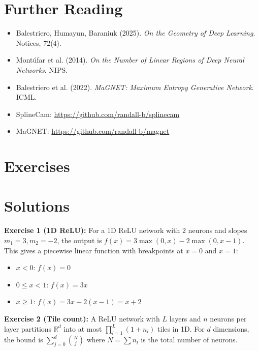 \section{Further Reading}
\label{sec:dl:refs}

\begin{itemize}
    \item Balestriero, Humayun, Baraniuk (2025). \textit{On the Geometry of Deep Learning}. Notices, 72(4).
    \item Montúfar et al. (2014). \textit{On the Number of Linear Regions of Deep Neural Networks}. NIPS.
    \item Balestriero et al. (2022). \textit{MaGNET: Maximum Entropy Generative Network}. ICML.
    \item SplineCam: \url{https://github.com/randall-b/splinecam}
    \item MaGNET: \url{https://github.com/randall-b/magnet}
\end{itemize}

\section{Exercises}
\section{Solutions}
\label{sec:dl:solutions}

\begin{solution}
\textbf{Exercise 1 (1D ReLU):} For a 1D ReLU network with 2 neurons and slopes $m_1 = 3, m_2 = -2$, the output is $f(x) = 3\max(0,x) - 2\max(0,x-1)$. This gives a piecewise linear function with breakpoints at $x = 0$ and $x = 1$:
\begin{itemize}
    \item $x < 0$: $f(x) = 0$
    \item $0 \leq x < 1$: $f(x) = 3x$
    \item $x \geq 1$: $f(x) = 3x - 2(x-1) = x + 2$
\end{itemize}
\end{solution}

\begin{solution}
\textbf{Exercise 2 (Tile count):} A ReLU network with $L$ layers and $n$ neurons per layer partitions $\mathbb{R}^d$ into at most $\prod_{l=1}^L (1 + n_l)$ tiles in 1D. For $d$ dimensions, the bound is $\sum_{j=0}^d \binom{N}{j}$ where $N = \sum n_l$ is the total number of neurons.
\end{solution}

